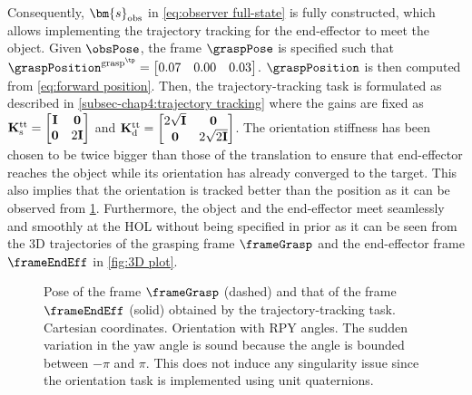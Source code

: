 


Consequently, $\bm{s}_{\rm obs}$ in \cref{eq:observer full-state} is fully constructed, which allows implementing the trajectory tracking for the end-effector to meet the object. 
Given $\obsPose$, the frame $\graspPose$ is specified such that $\graspPosition^{{\rm grasp}^{\tp}} = \begin{bmatrix} 0.07& 0.00& 0.03 \end{bmatrix}$. $\graspPosition$ is then computed from \cref{eq:forward position}. 
Then, the trajectory-tracking task is formulated as described in \cref{subsec-chap4:trajectory tracking} where the gains are fixed as $\mathbf{K}^{\rm tt}_{\rm s} = \begin{bmatrix}
	\mathbf{I} & \mathbf{0}\\\mathbf{0} & 2\mathbf{I}
\end{bmatrix}$ and $\mathbf{K}^{\rm tt}_{\rm d} = \begin{bmatrix}
	2\sqrt{\mathbf{I}} & \mathbf{0}\\\mathbf{0} & 2\sqrt{2\mathbf{I}}
\end{bmatrix}$. The orientation stiffness has been chosen to be twice bigger than those of the translation to ensure that  end-effector reaches the object while its orientation has already converged to the target. This also implies that the orientation is tracked better than the position as it can be observed from \cref{fig:trajTrack}. Furthermore, the object and the end-effector meet seamlessly and smoothly at the HOL without being specified in prior as it can be seen from the 3D trajectories of the grasping frame $\frameGrasp$ and the end-effector frame $\frameEndEff$ in \cref{fig:3D plot}. %
\begin{figure}
	\centering		
	\caption{Pose of the frame $\frameGrasp$ (dashed) and that of the frame $\frameEndEff$ (solid) obtained by the trajectory-tracking task.  Cartesian coordinates.  Orientation with RPY angles. The sudden variation in the yaw angle is sound because the angle is bounded between $-\pi$ and $\pi$. This does not induce any singularity issue since the orientation task is implemented using unit quaternions.}
	\label{fig:trajTrack}
\end{figure}
